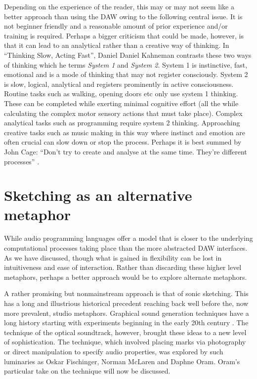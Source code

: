 \documentclass[12pt]{report}
\begin{document}
Depending on the experience of the reader, this may or may not seem like a
better approach than using the DAW owing to the following central issue. It is
not beginner friendly and a reasonable amount of prior experience and/or
training is required. Perhaps a bigger criticism that could be made, however, is
that it can lead to an analytical rather than a creative way of thinking. In
``Thinking Slow, Acting Fast'', Daniel Daniel Kahneman contrasts these two ways of
thinking which he terms \emph{System 1} and \emph{System 2}. System 1 is instinctive,
fast, emotional and is a mode of thinking that may not register consciously.
System 2 is slow, logical, analytical and registers prominently in active
consciousness. Routine tasks such as walking, opening doors etc only use system
1 thinking. These can be completed while exerting minimal cognitive effort (all
the while calculating the complex motor sensory actions that must take place).
Complex analytical tasks such as programming require system 2 thinking.
Approaching creative tasks such as music making in this way where instinct and
emotion are often crucial can slow down or stop the process. Perhaps it is best
summed by John Cage: ``Don't try to create and analyse at the same time. They're
different processes'' \cite{popova_10_2012}.

\chapter{Sketching as an alternative metaphor}
\label{sec:orgb0109e3}
While audio programming languages offer a model that is closer to the underlying
computational processes taking place than the more abstracted DAW interfaces. As
we have discussed, though what is gained in flexibility can be lost in
intuitiveness and ease of interaction. Rather than discarding these higher level
metaphors, perhaps a better approach would be to explore alternate metaphors.

A rather promising but nonmainstream approach is that of sonic sketching. This
has a long and illustrious historical precedent reaching back well before the,
now more prevalent, studio metaphors. Graphical sound generation techniques have
a long history starting with experiments beginning in the early 20th century
\cite[pg. 329]{roads_computer_1996}. The technique of the optical soundtrack,
however, brought these ideas to a new level of sophistication. The technique,
which involved placing marks via photography or direct manipulation to specify
audio properties, was explored by such luminaries as Oskar Fischinger, Norman
McLaren and Daphne Oram. Oram's particular take on the technique will now be
discussed.
\end{document}
